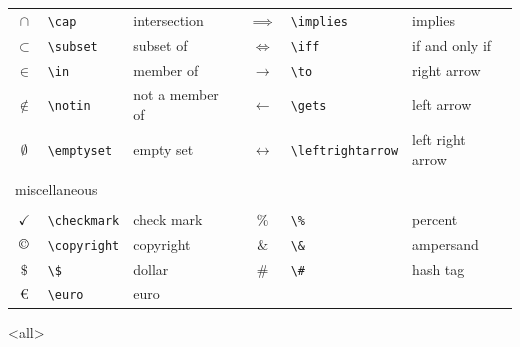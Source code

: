 \begin{table}[ht!]
\begin{tabular}{cll|cll}
        $\cap$	        &	\verb|\cap|	        &	intersection	    &	$\implies$	        &	\verb|\implies|	        &	implies	            \\
        $\subset$	    &	\verb|\subset|	    &	subset of	        &	$\iff$	            &	\verb|\iff|	            &	if and only if	    \\
        $\in$	        &	\verb|\in|	        &	member of	        &	$\to$	            &	\verb|\to|	            &	right arrow	        \\
        $\notin$	    &	\verb|\notin|	    &	not a member of	    &	$\gets$	            &	\verb|\gets|	        &	left arrow	        \\
        $\emptyset$	&	\verb|\emptyset|	    &	empty set	        &	$\leftrightarrow$	&	\verb|\leftrightarrow|	&	left right arrow	\\
        \\\multicolumn{2}{l}{miscellaneous}		&		                &		                &		                    &		                \\\\
        $\checkmark$	&	\verb|\checkmark|	&	check mark	        &	$\%$	            &	\verb|\%|	            &	percent	            \\
        $\copyright$	&	\verb|\copyright|	&	copyright	        &	$\&$	            &	\verb|\&|	            &	ampersand	        \\
        $\$$	        &	\verb|\$|	&	dollar              &	$\#$	            &	\verb|\#|	            &	hash tag            \\
        \euro	        &	\verb|\euro|	&	euro              &		            &	            &            \\
        \bottomrule
    \end{tabular}
\end{table}

\mode<all>